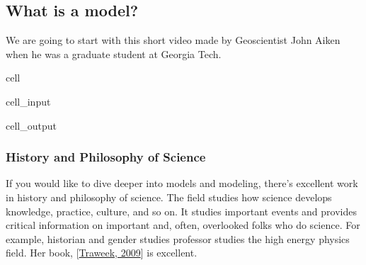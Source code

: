 \documentclass[letterpaper,10pt,english]{jupyterBook}
\begin{document}
\subsection{What is a model?}
\label{\detokenize{content/1_modeling/activity-what_is_a_model:what-is-a-model}}
\sphinxAtStartPar
We are going to start with this short video made by Geoscientist John Aiken when he was a graduate student at Georgia Tech.

\begin{sphinxuseclass}{cell}\begin{sphinxVerbatimInput}

\begin{sphinxuseclass}{cell_input}
\begin{sphinxVerbatim}[commandchars=\\\{\}]
   
      
\end{sphinxVerbatim}

\end{sphinxuseclass}\end{sphinxVerbatimInput}
\begin{sphinxVerbatimOutput}

\begin{sphinxuseclass}{cell_output}
\noindent{}

\end{sphinxuseclass}\end{sphinxVerbatimOutput}

\end{sphinxuseclass}

\subsubsection{History and Philosophy of Science}
\label{\detokenize{content/1_modeling/activity-what_is_a_model:history-and-philosophy-of-science}}
\sphinxAtStartPar
If you would like to dive deeper into models and modeling, there’s excellent work in history and philosophy of science. The field studies how science develops knowledge, practice, culture, and so on. It studies important events and provides critical information on important and, often, overlooked folks who do science. For example, historian and gender studies professor  studies the high energy physics field. Her book,  {[}\hyperlink{cite.content/X_additional_pages/references-page:id4}{Traweek, 2009}{]} is excellent.
\end{document}
